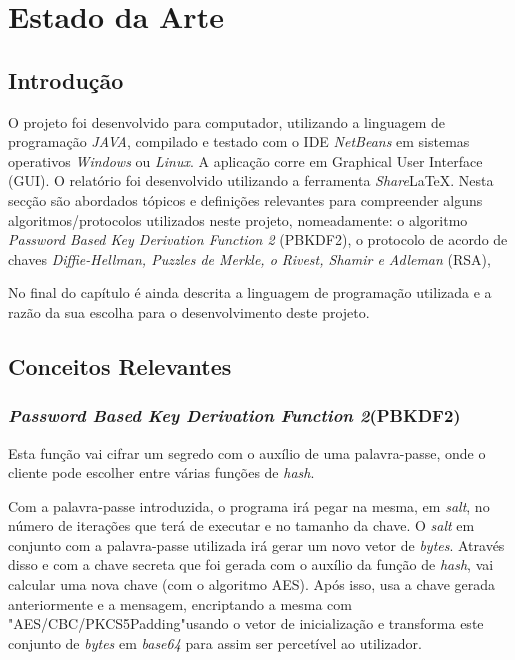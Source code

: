 \chapter{Estado da Arte}
\label{chap:estado-da-arte}

\setlength{\parskip}{1em}

\section{Introdução}
\label{chap2:sec:intro}
O projeto foi desenvolvido para computador, utilizando a linguagem de programação \textit{JAVA}, compilado e testado com o IDE \emph{NetBeans} em sistemas operativos \emph{Windows} ou \emph{Linux}. A aplicação corre em Graphical User Interface (GUI). O relatório foi desenvolvido utilizando a ferramenta \emph{Share}\LaTeX.
Nesta secção são abordados tópicos e definições relevantes para compreender alguns algoritmos/protocolos utilizados neste projeto, nomeadamente: o algoritmo \textit{Password Based Key Derivation Function 2} (PBKDF2), o protocolo de acordo de chaves \textit{Diffie-Hellman, Puzzles de Merkle, o Rivest, Shamir e Adleman} (RSA),  \par

No final do capítulo é ainda descrita a linguagem de programação utilizada e a razão da sua escolha para o desenvolvimento deste projeto.

\section{Conceitos Relevantes}
\label{chap2:sec:...}

\subsection{\textit{Password Based Key Derivation Function 2}(PBKDF2)}
Esta função vai cifrar um segredo com o auxílio de uma palavra-passe, onde o cliente pode escolher entre várias funções de \textit{hash}. \par
Com a palavra-passe introduzida, o programa irá pegar na mesma, em \textit{salt}, no número de iterações que terá de executar e no tamanho da chave. O \textit{salt} em conjunto com a palavra-passe utilizada irá gerar um novo vetor de \textit{bytes}. Através disso e com a chave secreta que foi gerada com o auxílio da função de \textit{hash}, vai calcular uma nova chave (com o algoritmo AES). Após isso, usa a chave gerada anteriormente e a mensagem, encriptando a mesma com "AES/CBC/PKCS5Padding"usando o vetor de inicialização e transforma este conjunto de \textit{ bytes} em \textit{base64} para assim ser percetível ao utilizador.


